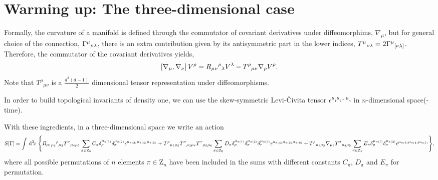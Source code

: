\documentclass[twocolumn,aps,
  showpacs,showkeys,prd,superscriptaddress]{revtex4-1}
\begin{document}
\section{Warming up: The three-dimensional case}

Formally, the curvature of a manifold is defined through the commutator of covariant derivatives under diffeomorphims, $\nabla_\mu$, but for general choice of the connection, $\Gamma^\mu{}_{\nu\lambda}$, there is an extra contribution given by its antisymmetric part in the lower indices, $T^\mu{}_{\nu\lambda} = 2\Gamma^\mu{}_{[\nu\lambda]}$. Therefore, the commutator of the covariant derivatives yields,
\begin{equation}
  \left[\nabla_{{\mu}},\nabla_{{\nu}}\right]V^\rho = R_{\mu\nu}{}^\rho{}_\lambda V^\lambda - T^\rho{}_{\mu\nu}\nabla_{{\rho}}V^\rho.
  \label{curvdef}
\end{equation}
Note that $T^\rho{}_{\mu\nu}$ is a $\tfrac{d^2(d-1)}{2}$ dimensional tensor representation under diffeomorphisms.

In order to build topological invariants of density one, we can use the skew-symmetric Levi-\v{C}ivita tensor $\epsilon^{\mu_1\mu_2\dots\mu_n}$ in $n$-dimensional space(-time).

\begin{widetext}
  With these ingredients, in a three-dimensional space we write an action 
  \begin{dmath}
    \label{accion3d}
    S[\Gamma] =
    \int \dn{3}{x}  \Bigg\{ R_{\mu_1\mu_2}{}^\rho{}_{\mu_3} T^\sigma{}_{\mu_4\mu_5} \sum_{\pi \in  \mathrm{Z}_5}C_\pi\delta_\rho^{\mu_{\pi(1)}} \delta_\sigma^{\mu_{\pi(2)}} \epsilon^{\mu_{\pi(3)}\mu_{\pi(4)}\mu_{\pi(5)}}  + T^\rho{}_{\mu_1\mu_2} T^\sigma{}_{\mu_3\mu_4} T^\tau{}_{\mu_5\mu_6} \sum_{\pi \in \mathrm{Z}_6}D_\pi\delta_\rho^{\mu_{\pi(1)}} \delta_\sigma^{\mu_{\pi(2)}}\delta_\tau^{\mu_{\pi(3)}}\epsilon^{\mu_{\pi(4)}\mu_{\pi(5)}\mu_{\pi(6)}} + T^\rho{}_{\mu_1\mu_2}\nabla_{\mu_3} T^\sigma{}_{\mu_4\mu_5}\sum_{\pi \in \mathrm Z_5}E_\pi\delta_\rho^{\mu_{\pi(1)}} \delta_\sigma^{\mu_{\pi(2)}}\epsilon^{\mu_{\pi(3)}\mu_{\pi(4)}\mu_{\pi(5)}} \Bigg\}, 
  \end{dmath}
  where all possible permutations of $n$ elements $\pi \in \mathrm{Z}_n$ have been included in the sums with  different constants $C_\pi$, $D_\pi$ and $E_\pi$ for  permutation. 
\end{widetext}
\end{document}
